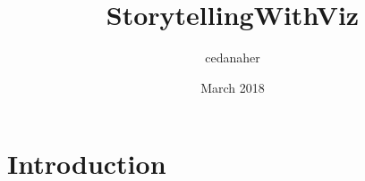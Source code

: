\documentclass{article}
\title{StorytellingWithViz}
\author{cedanaher }
\date{March 2018}
\begin{document}
\maketitle

\section{Introduction}
\end{document}
